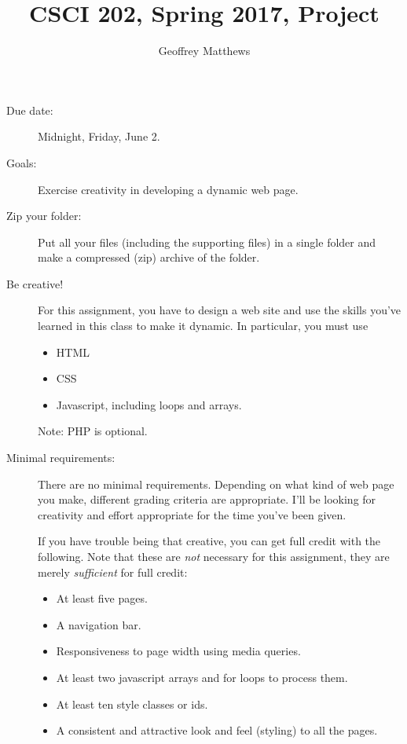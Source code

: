 \documentclass{article}
\title{CSCI 202, Spring 2017, Project}
\author{Geoffrey Matthews}
\begin{document}
\maketitle

\begin{description}

\item[Due date:] Midnight, Friday, June 2.

\item[Goals:] Exercise creativity in developing a dynamic web page.
  

\item[Zip your folder:]
  Put all your files (including the supporting files) in a single
  folder and  make a compressed (zip) archive of the folder.

\item[Be creative!]  For this assignment, you have to design a web
  site and use the skills you've learned in this class to make it
  dynamic.  In particular, you must use
  \begin{itemize}
  \item HTML
  \item CSS
  \item Javascript, including loops and arrays.
  \end{itemize}
  Note: PHP is optional.

\item[Minimal requirements:] There are no minimal
  requirements. Depending on what kind of web page you make, different
  grading criteria are appropriate.  I'll be looking for creativity
  and effort appropriate for the time you've been given.

  If you have trouble being that creative, you can get full credit
  with the following.  Note that these are {\em not} necessary for
  this assignment, they are merely {\em sufficient} for full credit:
  \begin{itemize}
  \item At least five pages.
  \item A navigation bar.
  \item Responsiveness to page width using media queries.
  \item At least two javascript arrays and for loops to process them.
  \item At least ten style  classes or ids.
  \item A consistent and attractive look and feel (styling) to all the
    pages. 
  \end{itemize}


\end{description}
\end{document}

